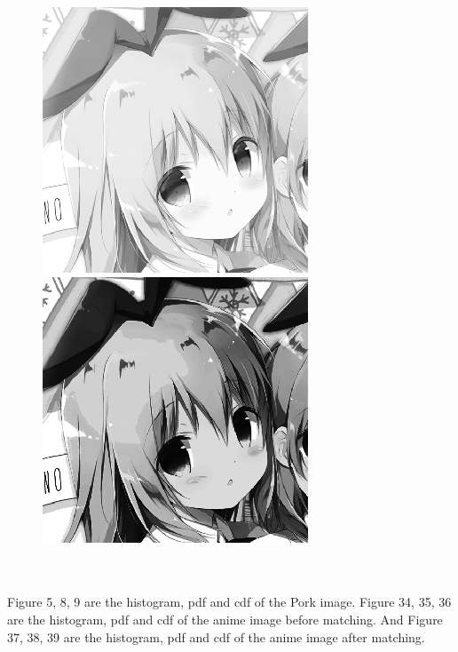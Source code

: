 \documentclass{article}
\begin{document}
\begin{enumerate}[label=B\arabic*)]
\begin{figure}[h!]
\begin{minipage}{0.32\textwidth}
				\includegraphics[width=0.8\linewidth]{Chino/Gray.png}
			\end{minipage}
			\hfill
			\begin{minipage}{0.32\textwidth}
				\centering
				\includegraphics[width=0.8\linewidth]{Chino/Equalized.png}
			\end{minipage}
		\end{figure}
		\\
		\\
		Figure 5, 8, 9 are the histogram, pdf and cdf of the Pork image. Figure 34, 35, 36 are the histogram, pdf and cdf of the anime image before matching. And Figure 37, 38, 39 are the histogram, pdf and cdf of the anime image after matching.

\end{enumerate}
\end{document}
